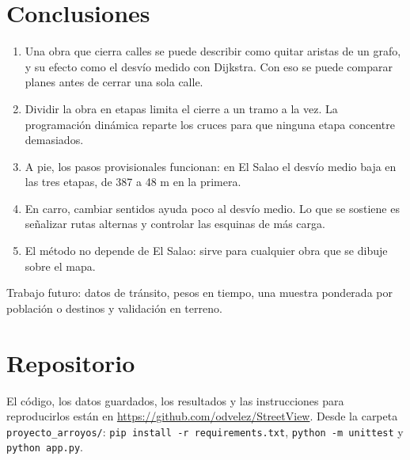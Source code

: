 \documentclass[12pt,letterpaper]{article}
\newcommand{\repo}{\url{https://github.com/odvelez/StreetView}}
\begin{document}
\section{Conclusiones}
\begin{enumerate}
\item Una obra que cierra calles se puede describir como quitar aristas de un grafo, y su efecto como el desvío medido con Dijkstra. Con eso se puede comparar planes antes de cerrar una sola calle.
\item Dividir la obra en etapas limita el cierre a un tramo a la vez. La programación dinámica reparte los cruces para que ninguna etapa concentre demasiados.
\item A pie, los pasos provisionales funcionan: en El Salao el desvío medio baja en las tres etapas, de 387 a 48 m en la primera.
\item En carro, cambiar sentidos ayuda poco al desvío medio. Lo que se sostiene es señalizar rutas alternas y controlar las esquinas de más carga.
\item El método no depende de El Salao: sirve para cualquier obra que se dibuje sobre el mapa.
\end{enumerate}
Trabajo futuro: datos de tránsito, pesos en tiempo, una muestra ponderada por población o destinos y validación en terreno.

\section*{Repositorio}
El código, los datos guardados, los resultados y las instrucciones para reproducirlos están en \repo. Desde la carpeta \texttt{proyecto\_arroyos/}: \texttt{pip install -r requirements.txt}, \texttt{python -m unittest} y \texttt{python app.py}.
\end{document}
